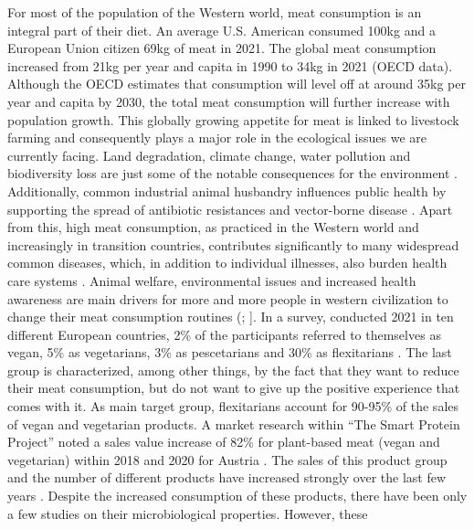 \documentclass[preprint, 3p,
authoryear]{elsarticle} %
\begin{document}
For most of the population of the Western world, meat consumption is an
integral part of their diet. An average U.S. American consumed 100kg and
a European Union citizen 69kg of meat in 2021. The global meat
consumption increased from 21kg per year and capita in 1990 to 34kg in
2021 (OECD data). Although the OECD estimates that consumption will
level off at around 35kg per year and capita by 2030, the total meat
consumption will further increase with population growth. This globally
growing appetite for meat is linked to livestock farming and
consequently plays a major role in the ecological issues we are
currently facing. Land degradation, climate change, water pollution and
biodiversity loss are just some of the notable consequences for the
environment \citep{Steinfeld.2006, Bianchi.2018}. Additionally, common
industrial animal husbandry influences public health by supporting the
spread of antibiotic resistances and vector-borne disease
\citep{Economou.2015, Bianchi.2018, Watts.2018}. Apart from this, high
meat consumption, as practiced in the Western world and increasingly in
transition countries, contributes significantly to many widespread
common diseases, which, in addition to individual illnesses, also burden
health care systems
\citep{Micha.2010, Chan.2011, Parkin.2011, Feskens.2013}. Animal
welfare, environmental issues and increased health awareness are main
drivers for more and more people in western civilization to change their
meat consumption routines (\citet{StollKleemann.2017};
\citet{Ploll.2020}{]}. In a survey, conducted 2021 in ten different
European countries, 2\% of the participants referred to themselves as
vegan, 5\% as vegetarians, 3\% as pescetarians and 30\% as flexitarians
\citep{EuropeanUnionsHorizon2020reasearchandinnovationprogramme.2021b}.
The last group is characterized, among other things, by the fact that
they want to reduce their meat consumption, but do not want to give up
the positive experience that comes with it. As main target group,
flexitarians account for 90-95\% of the sales of vegan and vegetarian
products. A market research within ``The Smart Protein Project'' noted a
sales value increase of 82\% for plant-based meat (vegan and vegetarian)
within 2018 and 2020 for Austria
\citep{EuropeanUnionsHorizon2020reasearchandinnovationprogramme.2021}.
The sales of this product group and the number of different products
have increased strongly over the last few years
\citep{Curtain.2019, EuropeanUnionsHorizon2020reasearchandinnovationprogramme.2021}.
Despite the increased consumption of these products, there have been
only a few studies on their microbiological properties. However, these
\end{document}
